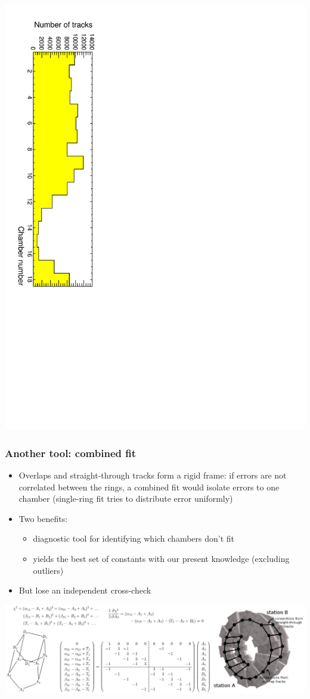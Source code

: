 \documentclass[compress]{beamer}
\begin{document}
\begin{frame}
\begin{center}
\includegraphics[height=0.75\linewidth, angle=90]{statistics.pdf}
\end{center}
\end{frame}

\begin{frame}
\frametitle{Another tool: combined fit}
\small

\begin{itemize}
\item Overlaps and straight-through tracks form a rigid frame: if errors are
not correlated between the rings, a combined fit would isolate errors
to one chamber (single-ring fit tries to distribute error uniformly)
\item Two benefits:
\begin{itemize}
\item diagnostic tool for identifying which chambers don't fit
\item yields the best set of constants with our present knowledge (excluding outliers)
\end{itemize}
\item But lose an independent cross-check
\end{itemize}

\vfill
\includegraphics[width=\linewidth]{matrix_description.png}
\end{frame}
\end{document}
